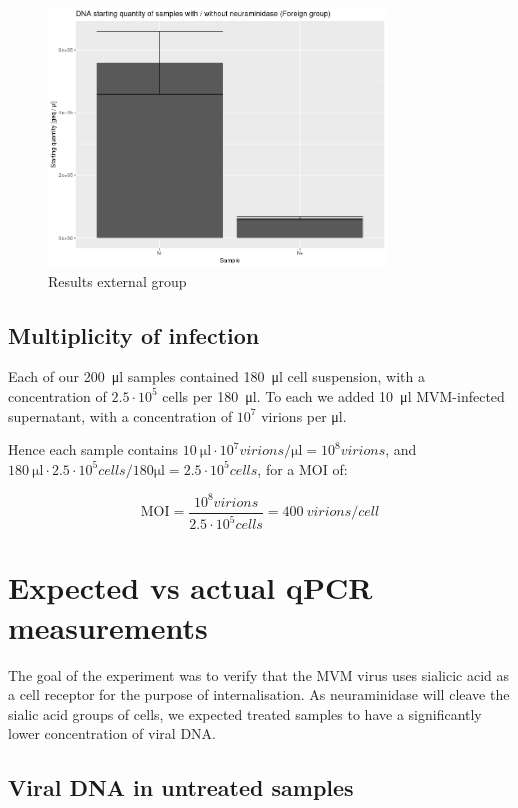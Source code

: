 \documentclass[a4paper,english]{scrreprt}
\begin{document}
\begin{figure}
	\centering
	\includegraphics[width=0.8\textwidth]{img/sq_groupxx.png}
	\caption{Results external group}
	\label{fig:sq_xx}
\end{figure}

\subsection{Multiplicity of infection}

Each of our \SI{200}{\ul} samples contained \SI{180}{\ul} cell suspension, with
a concentration of $2.5 \cdot 10^5$ cells per \SI{180}{\ul}. To each we added
\SI{10}{\ul} MVM-infected supernatant, with a concentration of $10^7$ virions
per \si{\ul}.

Hence each sample contains $\SI{10}{\ul} \cdot 10^7 \si{virions \per \ul} =
10^8 \si{virions}$, and $\SI{180}{\ul} \cdot 2.5 \cdot 10^5 \si{cells \per 180 \ul}
= 2.5 \cdot 10^5 \si{cells}$, for a MOI of:

\[
	\text{MOI} = \frac{10^8 \si{virions}}{2.5 \cdot 10^5 \si{cells}} = \SI{400}{virions \per cell}
\]

\section{Expected vs actual qPCR measurements}

The goal of the experiment was to verify that the MVM virus uses sialicic acid
as a cell receptor for the purpose of internalisation. As neuraminidase will
cleave the sialic acid groups of cells, we expected treated samples to have a
significantly lower concentration of viral DNA.

\subsection{Viral DNA in untreated samples}
\end{document}
